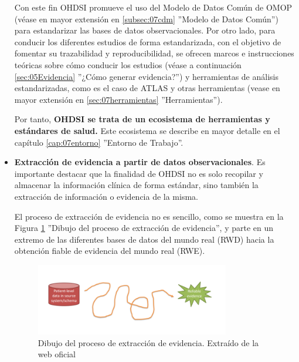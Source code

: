 \begin{itemize}
    Con este fin OHDSI promueve el uso del Modelo de Datos Común de OMOP (véase en mayor extensión en \ref{subsec:07cdm} ''Modelo de Datos Común'') para estandarizar las bases de datos observacionales. Por otro lado, para conducir los diferentes estudios de forma estandarizada, con el objetivo de fomentar su trazabilidad y reproducibilidad, se ofrecen marcos e instrucciones teóricas sobre cómo conducir los estudios (véase a continuación \ref{sec:05Evidencia} ''¿Cómo generar evidencia?'') y herramientas de análisis estandarizadas, como es el caso de ATLAS y otras herramientas (vease en mayor extensión en \ref{sec:07herramientas} ''Herramientas''). 
    
    Por tanto, \textbf{OHDSI se trata de un ecosistema de herramientas y estándares de salud.} Este ecosistema se describe en mayor detalle en el capítulo \ref{cap:07entorno} ''Entorno de Trabajo''.

    \item \textbf{Extracción de evidencia a partir de datos observacionales}. Es importante destacar que la finalidad de OHDSI no es solo recopilar y almacenar la información clínica de forma estándar, sino también la extracción de información o evidencia de la misma. 
    
    El proceso de extracción de evidencia no es sencillo, como se muestra en la Figura \ref{fig:drawinJourney} ''Dibujo del proceso de extracción de evidencia'', y parte en un extremo de las diferentes bases de datos del mundo real (RWD) hacia la obtención fiable de evidencia del mundo real (RWE). %

\begin{figure}[H]
    \centering
    \includegraphics[width=0.80\textwidth]{figures/drawinJourney.png}
     \caption{Dibujo del proceso de extracción de evidencia. Extraído de la web oficial \parencite{OHDSIwebsite}}
    \label{fig:drawinJourney}
\end{figure}


\end{itemize}
